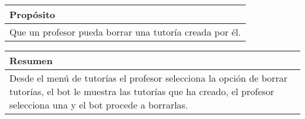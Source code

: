 \begin{table}[!ht]

\begin{tabular}{|m{10cm}|}
\hline\rowcolor{Gray}
{\bf Propósito}\\
\hline
{Que un profesor pueda borrar una tutoría creada por él.} \\
\hline

\end{tabular}


\end{table}

\begin{table}[!ht]

\begin{tabular}{|m{10cm}|}
\hline\rowcolor{Gray}
{\bf Resumen}\\
\hline
{Desde  el menú de tutorías el profesor selecciona la opción de borrar tutorías, el bot le muestra las tutorías que ha creado, el profesor selecciona una y el bot procede a borrarlas.} \\
\hline

\end{tabular}



\end{table}

